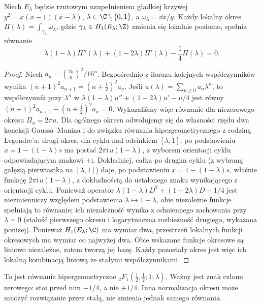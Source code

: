 \begin{twierdzenie}
\label{thm:xv-legendre-pf}
Niech $E_\lambda$ będzie rzutowym uzupełnieniem
gładkiej krzywej $y^2=x(x-1)(x-\lambda)$,
$\lambda\in\C\setminus\{0,1\}$, a
$\omega_\lambda=\dd x/y$. Każdy lokalny okres
$\Pi(\lambda)=\int_{\gamma_\lambda}\omega_\lambda$,
gdzie $\gamma_\lambda\in H_1(E_\lambda;\Z)$
zmienia się lokalnie poziomo, spełnia równanie
\[
\lambda(1-\lambda)\Pi''(\lambda)
+(1-2\lambda)\Pi'(\lambda)
-\frac14\Pi(\lambda)=0.
\]
\end{twierdzenie}
\begin{proof}
Niech $a_n=\binom{2n}{n}^2/16^n$.
Bezpośrednio z ilorazu kolejnych współczynników wynika
$(n+1)^2a_{n+1}=(n+\frac12)^2a_n$.
Jeśli $u(\lambda)=\sum_{n\ge0}a_n\lambda^n$,
to współczynnik przy $\lambda^n$ w
$\lambda(1-\lambda)u''+(1-2\lambda)u'-u/4$
jest równy
$(n+1)^2a_{n+1}-(n+\frac12)^2a_n=0$.
Wykazaliśmy więc równanie dla niezerowego okresu
$\Pi_a=2\pi u$. Dla ogólnego okresu odwołujemy się
do własności rzędu dwa koneksji Gaussa--Manina i
do związku równania hipergeometrycznego z rodziną
Legendre'a: drugi okres, dla cyklu nad odcinkiem $[\lambda,1]$,
po podstawieniu $x=1-(1-\lambda)s$ ma postać
$2\pi\mathrm i\,u(1-\lambda)$, z wyborem orientacji cyklu
odpowiadającym znakowi $+\mathrm i$.
Dokładniej, całka po drugim cyklu (z wybraną gałęzią
pierwiastka na $[\lambda,1]$) daje, po podstawieniu
$x=1-(1-\lambda)s$, właśnie funkcję
$2\pi\mathrm i\,u(1-\lambda)$, z dokładnością do
ustalonego znaku wynikającego z orientacji cyklu.
Ponieważ operator
$\lambda(1-\lambda)D^2+(1-2\lambda)D-1/4$
jest niezmienniczy względem podstawienia
$\lambda\mapsto1-\lambda$, obie niezależne
funkcje spełniają to równanie; ich niezależność
wynika z odmiennego zachowania przy $\lambda=0$
(stałość pierwszego okresu i logarytmiczna
rozbieżność drugiego, wykazana poniżej).
Ponieważ $H_1(E_\lambda;\C)$ ma wymiar dwa,
przestrzeń lokalnych funkcji okresowych ma wymiar
co najwyżej dwa. Obie wskazane funkcje okresowe są
liniowo niezależne, zatem tworzą jej bazę.
Każdy pozostały okres jest więc ich lokalną
kombinacją liniową ze stałymi współczynnikami.
\end{proof}
\begin{uwaga}
To jest równanie hipergeometryczne
${}_2F_1(\frac12,\frac12;1;\lambda)$.
Ważny jest znak członu zerowego: stoi przed nim
$-1/4$, a nie $+1/4$. Inna normalizacja okresu
może mnożyć rozwiązanie przez stałą, nie zmienia jednak
samego równania.
\end{uwaga}


